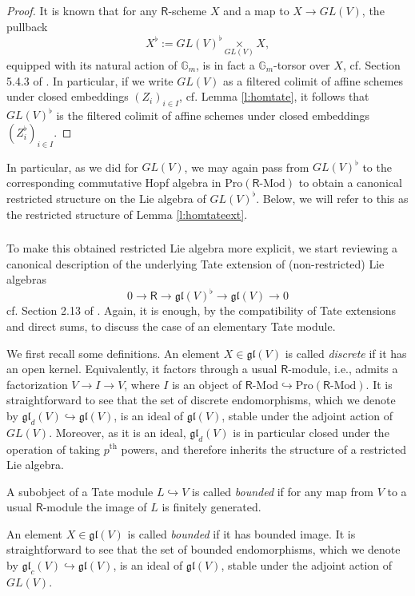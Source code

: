 \documentclass{amsart}
\theoremstyle{definition}
\newcommand{\gl}{\mathfrak{gl}}
\newcommand{\Pro}{\on{Pro}}
\newcommand{\sss}{\subsubsection{}}
\renewcommand{\mod}{\text{-}\on{Mod}}
\newcommand{\on}{\mathrm}
\newcommand{\Ring}{\mathsf{R}}
\numberwithin{equation}{section}
\begin{document}
\begin{proof} It is known that for any $\Ring$-scheme $X$ and a map to $X \rightarrow GL(V)$, 
the pullback $$X^\flat := GL(V)^\flat \underset{GL(V)} \times X,$$equipped with its natural action of $\mathbb{G}_{m}$, is in fact a $\mathbb{G}_m$-torsor over $X$, cf. Section 5.4.3 of \cite{DrInf}. In particular, if we write $GL(V)$ as a filtered colimit of affine schemes under closed embeddings $(Z_i)_{i \in I}$, cf. Lemma \ref{l:homtate}, it follows that $GL(V)^\flat$ is the filtered colimit of affine schemes under closed embeddings $(Z_i^\flat)_{i \in I}.$     
\end{proof}

In particular, as we did for $GL(V)$, we may again pass from $GL(V)^\flat$ to the corresponding commutative Hopf algebra in $\Pro(\Ring\mod)$ to obtain a canonical restricted structure on the Lie algebra of $GL(V)^\flat$.   Below, we will refer to this as the restricted structure of Lemma \ref{l:homtateext}. 



\sss To make this obtained restricted Lie algebra more explicit, we start reviewing a canonical description of the underlying  Tate extension of (non-restricted) Lie algebras
$$0 \rightarrow \Ring \rightarrow \mathfrak{gl}(V)^\flat \rightarrow \mathfrak{gl}(V) \rightarrow 0$$cf. Section 2.13 of \cite{BBE}. Again, it is enough, by the compatibility of Tate extensions and direct sums, to discuss the case of an elementary Tate module. 


We first recall some definitions. An element $X \in \gl(V)$ is called {\em discrete} if it has an open kernel. Equivalently, it factors through a usual $\Ring$-module, i.e., admits a factorization $V \rightarrow I \rightarrow V$, where $I$ is an object of $\Ring\mod \hookrightarrow \Pro(\Ring\mod)$. It is straightforward to see that the set of discrete endomorphisms, which we denote by $\gl_d(V) \hookrightarrow \gl(V)$, is an ideal of $\gl(V)$, stable under the adjoint action of $GL(V)$. Moreover, as it is an ideal, $\gl_d(V)$ is in particular closed under the operation of taking $p^{\on{th}}$ powers, and therefore inherits the structure of a restricted Lie algebra. 

A subobject of a Tate module $L \hookrightarrow V$ is called {\em bounded} if for any map from $V$ to a usual $\Ring$-module the image of $L$ is finitely generated.

An element $X \in \gl(V)$ is called {\it bounded} if it has bounded image. It is straightforward to see that the set of bounded endomorphisms, which we denote by $\gl_c(V) \hookrightarrow \gl(V)$, is an ideal of $\gl(V)$, stable under the adjoint action of $GL(V)$. 
\end{document}
